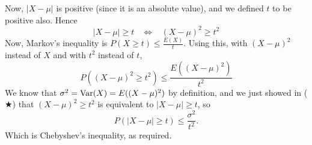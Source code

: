 \noindent Now, $|X - \mu|$ is positive (since it is an absolute value), and we defined $t$ to be positive also. Hence
\[
|X - \mu| \geq t \;\;\; \iff \;\;\; (X - \mu)^2 \geq t^2 \tag{$\bigstar$}
\]
Now, Markov's inequality is $P(X \geq t) \leq \frac{E(X)}{t}$. Using this, with $(X - \mu)^2$ instead of $X$ and with $t^2$ instead of $t$,
\[
P((X - \mu)^2 \geq t^2) \leq \frac{E((X - \mu)^2)}{t^2}
\]  
We know that $\sigma^2 = \text{Var}(X) = E((X - \mu)^2)$ by definition, and we just showed in ($\bigstar$) that $(X - \mu)^2 \geq t^2$ is equivalent to $|X - \mu| \geq t$, so
\[
P(|X - \mu| \geq t) \leq \frac{\sigma^2}{t^2}.
\]
Which is Chebyshev's inequality, as required.


































